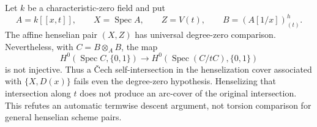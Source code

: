 \begin{proposition}\label{B:henselized-Cech-obstruction}
Let $k$ be a characteristic-zero field and put
\[
 A=k[[x,t]],\qquad X=\operatorname{Spec}A,\qquad Z=V(t),
 \qquad B=(A[1/x])^h_{(t)}.
\]
The affine henselian pair $(X,Z)$ has universal degree-zero
comparison. Nevertheless, with $C=B\otimes_A B$, the map
\[
 H^0(\operatorname{Spec}C,\{0,1\})\longrightarrow
 H^0(\operatorname{Spec}(C/tC),\{0,1\})
\]
is not injective. Thus a \v Cech self-intersection in the
henselization cover associated with $\{X,D(x)\}$ fails even the
degree-zero hypothesis. Henselizing that intersection along $t$
does not produce an arc-cover of the original intersection.
This refutes an automatic termwise descent argument, not torsion
comparison for general henselian scheme pairs.
\end{proposition}
